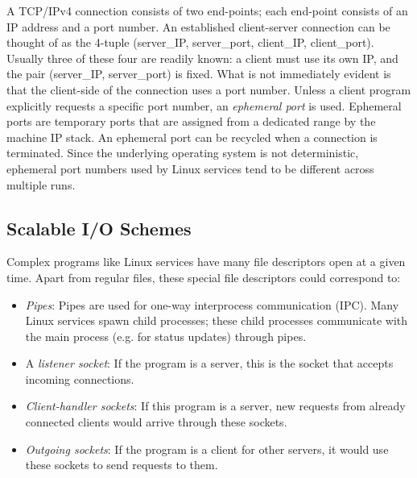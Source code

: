  \newline
A TCP/IPv4 connection consists of two end-points;
each end-point consists of an IP address and a port
number. An established client-server connection 
can be thought of as the
4-tuple (server\_IP, server\_port, client\_IP, client\_port).
Usually three of these four are readily known:
a client must use its own IP, and
the pair (server\_IP, server\_port) is fixed. What is not
immediately evident is that the client-side of 
the connection uses a port number.
Unless a client program explicitly
requests a specific port number,
an {\em ephemeral port} is used.
Ephemeral ports are temporary ports that are
assigned from a dedicated range by the machine IP stack.
An ephemeral port can be recycled
when a connection is terminated.
Since the underlying operating system
is not deterministic, ephemeral
port numbers used by Linux services
tend to be different across multiple 
runs. 

\subsection{Scalable I/O Schemes} \label{ch3:poll}
 \newline
Complex programs like Linux services have
many file descriptors open at a given time.
Apart from regular files, these special 
file descriptors could correspond to:

\begin{itemize}

\item {\em Pipes}: Pipes are used for
  one-way interprocess communication (IPC).
  Many Linux services spawn child processes;
  these child processes communicate
  with the main process (e.g. for status
  updates) through pipes.

\item A {\em listener socket}:
  If the program is a server,
  this is the socket that accepts incoming connections.

\item {\em Client-handler sockets}:
  If this program is a server, 
  new requests from already connected clients would arrive through
  these sockets.

\item {\em Outgoing sockets}:
  If the program is a client for other servers,
  it would use these sockets to send requests 
  to them.
\end{itemize}

